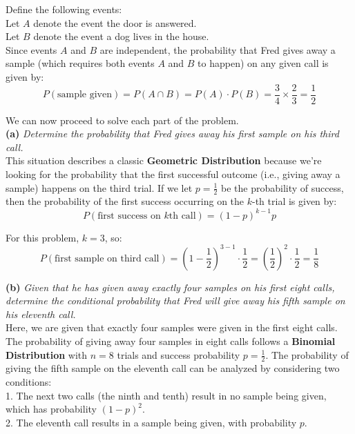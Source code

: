 \begin{solution}
    Define the following events:\\
    
    Let \(A\) denote the event the door is answered.\\
    Let \(B\) denote the event a dog lives in the house.\\

Since events \(A\) and \(B\) are independent, the probability that Fred gives away a sample (which requires both events \(A\) and \(B\) to happen) on any given call is given by:
\[
P(\text{sample given}) = P(A \cap B) = P(A) \cdot P(B) = \frac{3}{4} \times \frac{2}{3} = \frac{1}{2}
\]

We can now proceed to solve each part of the problem.\\

\textbf{(a)} \textit{Determine the probability that Fred gives away his first sample on his third call.}\\

This situation describes a classic \textbf{Geometric Distribution} because we’re looking for the probability that the first successful outcome (i.e., giving away a sample) happens on the third trial. If we let \(p = \frac{1}{2}\) be the probability of success, then the probability of the first success occurring on the \(k\)-th trial is given by:
\[
P(\text{first success on } k\text{th call}) = (1 - p)^{k-1} p
\]

For this problem, \(k = 3\), so:
\[
P(\text{first sample on third call}) = (1 - \frac{1}{2})^{3-1} \cdot \frac{1}{2} = \left(\frac{1}{2}\right)^{2} \cdot \frac{1}{2} = \frac{1}{8}
\]

\textbf{(b)} \textit{Given that he has given away exactly four samples on his first eight calls, determine the conditional probability that Fred will give away his fifth sample on his eleventh call.}\\

Here, we are given that exactly four samples were given in the first eight calls. The probability of giving away four samples in eight calls follows a \textbf{Binomial Distribution} with \(n = 8\) trials and success probability \(p = \frac{1}{2}\). The probability of giving the fifth sample on the eleventh call can be analyzed by considering two conditions:\\

1. The next two calls (the ninth and tenth) result in no sample being given, which has probability \((1 - p)^2\).\\
2. The eleventh call results in a sample being given, with probability \(p\).\\


\end{solution}
